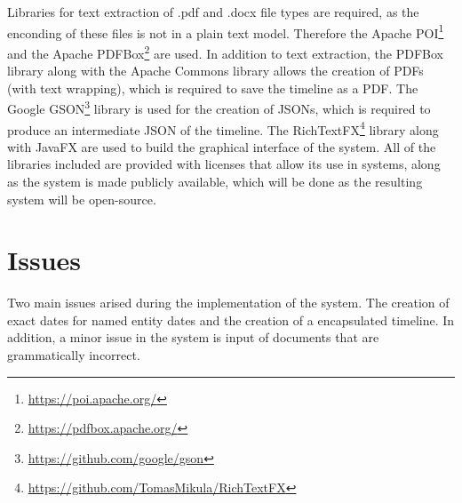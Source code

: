 \par Libraries for text extraction of .pdf and .docx file types are required, as the enconding of these files is not in a plain text model. Therefore the Apache POI\footnote{\url{https://poi.apache.org/}} and the Apache PDFBox\footnote{\url{https://pdfbox.apache.org/}} are used. In addition to text extraction, the PDFBox library along with the Apache Commons library allows the creation of PDFs (with text wrapping), which is required to save the timeline as a PDF. The Google GSON\footnote{\url{https://github.com/google/gson}} library is used for the creation of JSONs, which is required to produce an intermediate JSON of the timeline. The RichTextFX\footnote{\url{https://github.com/TomasMikula/RichTextFX}} library along with JavaFX are used to build the graphical interface of the system. All of the libraries included are provided with licenses that allow its use in systems, along as the system is made publicly available, which will be done as the resulting system will be open-source.

\section{Issues}
\par Two main issues arised during the implementation of the system. The creation of exact dates for named  entity dates and the creation of a encapsulated timeline. In addition, a minor issue in the system is input of documents that are grammatically incorrect.
